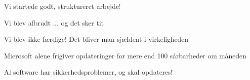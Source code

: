 \documentclass[Screen16to9,17pt]{foils}
\begin{document}

\begin{list2}
\item Vi startede godt, struktureret arbejde!
\item Vi blev afbrudt ... og det sker tit
\item Vi blev ikke færdige! Det bliver man sjældent i virkeligheden
\item Microsoft alene frigiver opdateringer for mere end 100 sårbarheder om måneden
\item Al software har sikkerhedsproblemer, og skal opdateres!
\end{list2}



\hlkprofiluk
\end{document}
